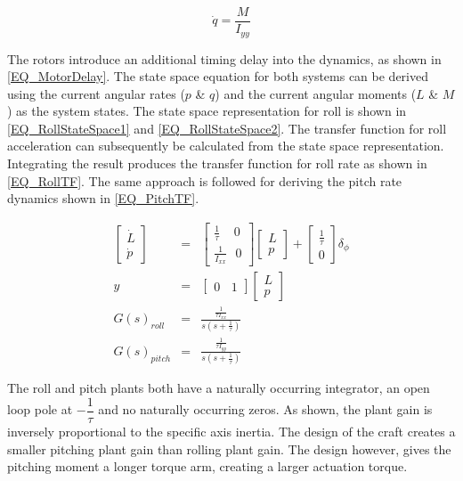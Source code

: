 \documentclass[12pt]{report}
\begin{document}
\begin{equation}
\label{EQ_PitchNewton}
\dot{q} = \dfrac{M}{I_{yy}}
\end{equation}

The rotors introduce an additional timing delay into the dynamics, as shown in \eqref{EQ_MotorDelay}. The state space equation for both systems can be derived using the current angular rates ($p$ \& $q$) and the current angular moments ($L$ \& $M$) as the system states. The state space representation for roll is shown in \eqref{EQ_RollStateSpace1} and \eqref{EQ_RollStateSpace2}. The transfer function for roll acceleration can subsequently be calculated from the state space representation. Integrating the result produces the transfer function for roll rate as shown in \eqref{EQ_RollTF}. The same approach is followed for deriving the pitch rate dynamics shown in \ref{EQ_PitchTF}.

\begin{eqnarray}
\begin{bmatrix} \dot{L} \\ \dot{p}	\end{bmatrix}&=&\begin{bmatrix}\frac{1}{\tau}\ \ \ \ \ 0\\\frac{1}{I_{xx}} \ \ \ 0 \end{bmatrix} \begin{bmatrix} L \\ p \end{bmatrix} + \begin{bmatrix}\frac{1}{\tau}\\ 0 \end{bmatrix} \delta_\phi\label{EQ_RollStateSpace1}\\\label{EQ_RollStateSpace11} 
y &=& \begin{bmatrix} 0 \ \ \ \ 1 \end{bmatrix} \begin{bmatrix} L \\ p \end{bmatrix} \label{EQ_RollStateSpace2}\\
G(s)_{roll} &=& \frac{\frac{1}{\tau I_{xx}}}{s (s + \frac{1}{\tau})}\label{EQ_RollTF}\\
G(s)_{pitch} &=& \frac{\frac{1}{\tau I_{yy}}}{s (s + \frac{1}{\tau})}\label{EQ_PitchTF}
\end{eqnarray}

The roll and pitch plants both have a naturally occurring integrator, an open loop pole at $-\dfrac{1}{\tau}$ and no naturally occurring zeros. As shown, the plant gain is inversely proportional to the specific axis inertia. The design of the craft creates a smaller pitching plant gain than rolling plant gain. The design however, gives the pitching moment a longer torque arm, creating a larger actuation torque.
\end{document}
